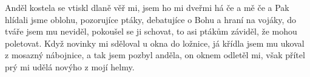 \begin{TEXT}{Anděl}
\SLOKA {} kostela   \NL
{}  \NL
{} se   \NL
{} vtiskl  dlaně  
\REFREN {}  věř mi,  jsem ho \NL
{} mi  dveřmi  há\NL
{} če a  mě če a 
\SLOKA Pak hlídali jsme oblohu, pozorujíce ptáky,\NL
debatujíce o Bohu  a hraní  na vojáky,\NL
do tváře jsem mu neviděl, pokoušel se ji schovat,\NL
to asi ptákům záviděl, že mohou poletovat.
\REFRENHRAJ
\SLOKA Když novinky mi sděloval u okna do ložnice,\NL
já křídla jsem mu ukoval z mosazný nábojnice,\NL
a tak jsem pozbyl anděla, on oknem odletěl mi,\NL
však přítel prý mi udělá novýho z mojí helmy.
\REFRENHRAJ
\end{TEXT}
